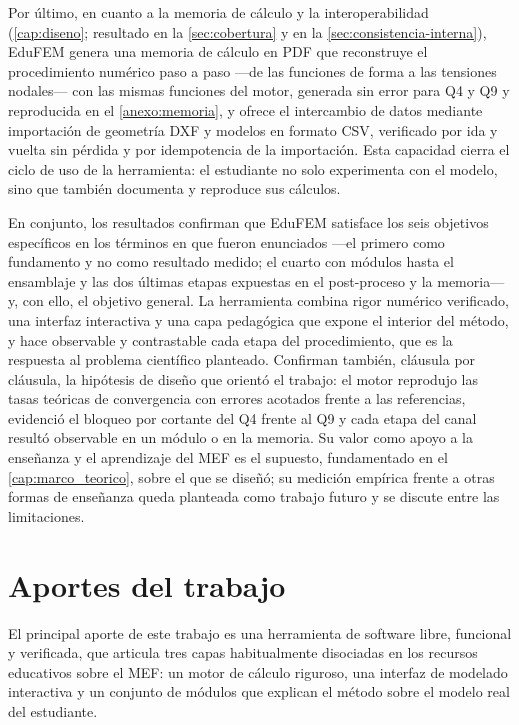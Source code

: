 Por último, en cuanto a la memoria de cálculo y la interoperabilidad (\autoref{cap:diseno}; resultado en la \autoref{sec:cobertura} y en la \autoref{sec:consistencia-interna}), EduFEM genera una memoria de cálculo en PDF que reconstruye el procedimiento numérico paso a paso —de las funciones de forma a las tensiones nodales— con las mismas funciones del motor, generada sin error para Q4 y Q9 y reproducida en el \autoref{anexo:memoria}, y ofrece el intercambio de datos mediante importación de geometría DXF y modelos en formato CSV, verificado por ida y vuelta sin pérdida y por idempotencia de la importación. Esta capacidad cierra el ciclo de uso de la herramienta: el estudiante no solo experimenta con el modelo, sino que también documenta y reproduce sus cálculos.

En conjunto, los resultados confirman que EduFEM satisface los seis objetivos específicos en los términos en que fueron enunciados —el primero como fundamento y no como resultado medido; el cuarto con módulos hasta el ensamblaje y las dos últimas etapas expuestas en el post-proceso y la memoria— y, con ello, el objetivo general. La herramienta combina rigor numérico verificado, una interfaz interactiva y una capa pedagógica que expone el interior del método, y hace observable y contrastable cada etapa del procedimiento, que es la respuesta al problema científico planteado. Confirman también, cláusula por cláusula, la hipótesis de diseño que orientó el trabajo: el motor reprodujo las tasas teóricas de convergencia con errores acotados frente a las referencias, evidenció el bloqueo por cortante del Q4 frente al Q9 y cada etapa del canal resultó observable en un módulo o en la memoria. Su valor como apoyo a la enseñanza y el aprendizaje del MEF es el supuesto, fundamentado en el \autoref{cap:marco_teorico}, sobre el que se diseñó; su medición empírica frente a otras formas de enseñanza queda planteada como trabajo futuro y se discute entre las limitaciones.

\section*{Aportes del trabajo}

El principal aporte de este trabajo es una herramienta de software libre, funcional y verificada, que articula tres capas habitualmente disociadas en los recursos educativos sobre el MEF: un motor de cálculo riguroso, una interfaz de modelado interactiva y un conjunto de módulos que explican el método sobre el modelo real del estudiante.

